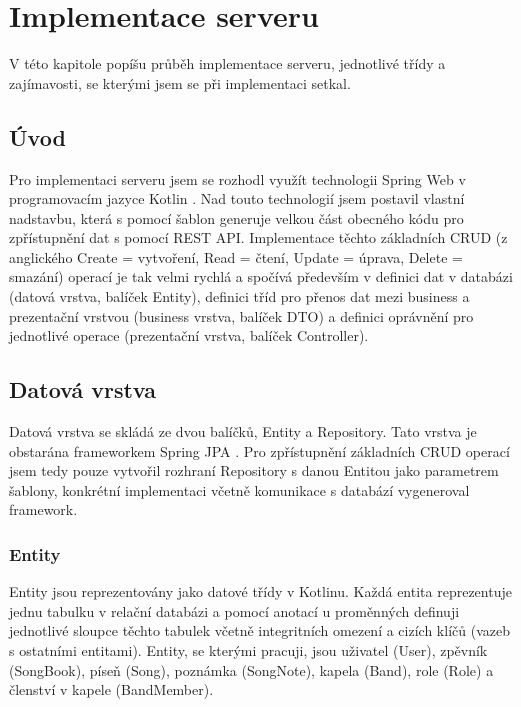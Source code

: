 \chapter{Implementace serveru}

\begin{chapterabstract}
    V této kapitole popíšu průběh implementace serveru, jednotlivé třídy a zajímavosti, se kterými jsem se při implementaci setkal.
\end{chapterabstract}

\section{Úvod}

Pro implementaci serveru jsem se rozhodl využít technologii Spring Web \cite{spring-web} v programovacím jazyce Kotlin \cite{kotlin}. Nad touto technologií jsem postavil vlastní nadstavbu, která s pomocí šablon generuje velkou část obecného kódu pro zpřístupnění dat s pomocí REST API. Implementace těchto základních CRUD (z anglického Create = vytvoření, Read = čtení, Update = úprava, Delete = smazání) operací je tak velmi rychlá a spočívá především v definici dat v databázi (datová vrstva, balíček Entity), definici tříd pro přenos dat mezi business a prezentační vrstvou (business vrstva, balíček DTO) a definici oprávnění pro jednotlivé operace (prezentační vrstva, balíček Controller).

\section{Datová vrstva}

Datová vrstva se skládá ze dvou balíčků, Entity a Repository. Tato vrstva je obstarána frameworkem Spring JPA \cite{spring-jpa}. Pro zpřístupnění základních CRUD operací jsem tedy pouze vytvořil rozhraní Repository s danou Entitou jako parametrem šablony, konkrétní implementaci včetně komunikace s databází vygeneroval framework.

\subsection{Entity}

Entity jsou reprezentovány jako datové třídy v Kotlinu. Každá entita reprezentuje jednu tabulku v relační databázi a pomocí anotací u proměnných definuji jednotlivé sloupce těchto tabulek včetně integritních omezení a cizích klíčů (vazeb s ostatními entitami). Entity, se kterými pracuji, jsou uživatel (User), zpěvník (SongBook), píseň (Song), poznámka (SongNote), kapela (Band), role (Role) a členství v kapele (BandMember).

